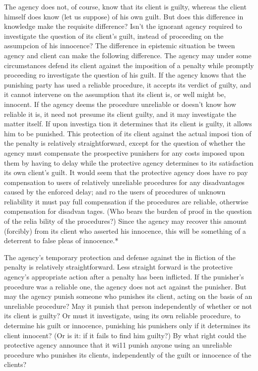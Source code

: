 \documentclass[11pt,openany]{book}
\begin{document}
The agency does not, of course, know that its client is guilty, whereas the client himself does know (let us suppose) of his own guilt. But does this difference in knowledge make the requisite difference? Isn't the ignorant agency required to investigate the question of its client's guilt, instead of proceeding on the assumpcion of his innocence? The difference in epistemic situation be tween agency and client can make the following difference. The agency may under some circumstances defend its client against the imposition of a penalty while promptly proceeding ro investigate the question of his guilt. If the agency knows that the punishing party has used a reliable procedure, it accepts its verdict of guilty, and it cannot intervene on the assumption that its client is, or well might be, innocent. If the agency deems the procedure unreliable or doesn't know how reliable it is, it need not presume its client guilty, and it may investigate the matter itself. If upon investiga tion it determines that its client is guilty, it allows him to be punished. This protection of its client against the actual imposi tion of the penalty is relatively straightforward, except for the question of whether the agency must compensate the prospective punishers for any costs imposed upon them by having to delay while the protective agency determines to its satisfaction its own client's guilt. It would seem that the protective agency does have ro pay compensation to users of relatively unreliable procedures for any disadvantages caused by the enforced delay; and ro the users of procedures of unknown reliability it must pay full compensation if the procedures are reliable, otherwise compensation for disadvan tages. (Who bears the burden of proof in the question of the relia bility of the procedures?) Since the agency may recover this amount (forcibly) from its client who asserted his innocence, this will be something of a deterrent to false pleas of innocence.* 

The agency's temporary protection and defense against the in fliction of the penalty is relatively straightforward. Less straight forward is the protective agency's appropriate action after a penalty has been inflicted. If the punisher's procedure was a reliable one, the agency does not act against the punisher. But may the agency punish someone who punishes its client, acting on the basis of an unreliable procedure? May it punish that person independently of whether or not its client is guilty? Or must it investigate, using its own reliable procedure, to determine his guilt or innocence, punishing his punishers only if it determines its client innocent? (Or is it: if it fails to find him guilty?) By what right could the protective agency announce that it wi11 punish anyone using an unreliable procedure who punishes its clients, independently of the guilt or innocence of the clients? 
\end{document}
